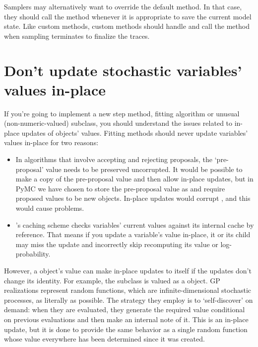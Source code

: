 Samplers may alternatively want to override the default  method. In that case, they should call the  method whenever it is appropriate to save the current model state. Like custom  methods, custom  methods should handle  and call the  method when sampling terminates to finalize the traces.

\hypertarget{dont-update-indepth}{}
\section{Don't update stochastic variables' values in-place}
\label{dont-update-indepth}

If you're going to implement a new step method, fitting algorithm or unusual (non-numeric-valued)  subclass, you should understand the issues related to in-place updates of  objects' values. Fitting methods should never update variables' values in-place for two reasons:
\begin{itemize}
   \item In algorithms that involve accepting and rejecting proposals, the `pre-proposal' value needs to be preserved uncorrupted. It would be possible to make a copy of the pre-proposal value and then allow in-place updates, but in PyMC we have chosen to store the pre-proposal value as  and require proposed values to be new objects. In-place updates would corrupt , and this would cause problems.
   \item {}'s caching scheme checks variables' current values against its internal cache by reference. That means if you update a variable's value in-place, it or its child may miss the update and incorrectly skip recomputing its value or log-probability.
\end{itemize}

However, a  object's value can make in-place updates to itself if the updates don't change its identity. For example, the  subclass  is valued as a  object. GP realizations represent random functions, which are infinite-dimensional stochastic processes, as literally as possible. The strategy they employ is to `self-discover' on demand: when they are evaluated, they generate the required value conditional on previous evaluations and then make an internal note of it. This is an in-place update, but it is done to provide the same behavior as a single random function whose value everywhere has been determined since it was created.
